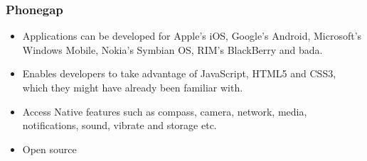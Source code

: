 \subsubsection{Phonegap}
	\begin{itemize}
		\item Applications can be developed for Apple’s iOS, Google’s Android,
		Microsoft’s Windows Mobile, Nokia’s Symbian OS, RIM’s BlackBerry and bada.
		\item Enables developers to take advantage of JavaScript, HTML5 and CSS3,
		which they might have already been familiar with.
		\item Access Native features such as compass, camera, network, media,
		notifications, sound, vibrate and storage etc.
		\item Open source
	\end{itemize}
